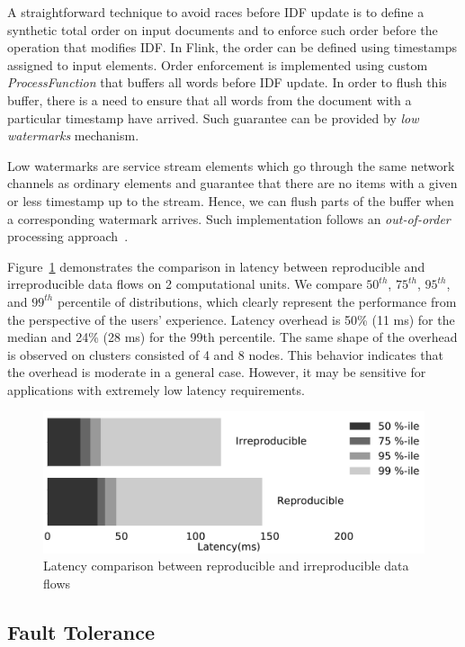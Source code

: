 A straightforward technique to avoid races before IDF update is to define a synthetic total order on input documents and to enforce such order before the operation that modifies IDF. In Flink, the order can be defined using timestamps assigned to input elements. Order enforcement is implemented using custom {\it ProcessFunction} that buffers all words before IDF update. In order to flush this buffer, there is a need to ensure that all words from the document with a particular timestamp have arrived. Such guarantee can be provided by {\em low watermarks} mechanism. 

Low watermarks are service stream elements which go through the same network channels as ordinary elements and guarantee that there are no items with a given or less timestamp up to the stream. Hence, we can flush parts of the buffer when a corresponding watermark arrives. Such implementation follows an {\em out-of-order} processing approach~\cite{Li:2008:OPN:1453856.1453890}.

Figure~\ref{reproducibility} demonstrates the comparison in latency between reproducible and irreproducible data flows on 2 computational units. We compare $50^{th}$, $75^{th}$, $95^{th}$, and $99^{th}$ percentile of distributions, which clearly represent the performance from the perspective of the users' experience. Latency overhead is 50\% (11 ms) for the median and 24\% (28 ms) for the 99th percentile. The same shape of the overhead is observed on clusters consisted of 4 and 8 nodes. This behavior indicates that the overhead is moderate in a general case. However, it may be sensitive for applications with extremely low latency requirements.

\begin{figure}[htbp]
  \centering
  \includegraphics[scale=0.09]{pics/reproducibility}
  \caption{Latency comparison between reproducible and irreproducible data flows}
  \label {reproducibility}
\end{figure}

\subsection{Fault Tolerance}


